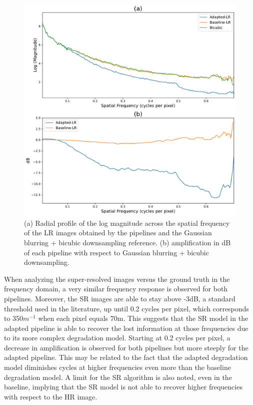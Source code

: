         \begin{figure}[H]
            \centering
            \includegraphics[scale=0.45]{Includes/5-lr-images-fft-comparison.pdf}
            \caption{(a) Radial profile of the log magnitude across the spatial frequency of the LR images obtained by the pipelines and the Gaussian blurring + bicubic downsampling reference. (b) amplification in dB of each pipeline with respect to Gaussian blurring + bicubic downsampling.}
            \label{fig:5-lr-images-fft-comparison.pdf}
        \end{figure}

        When analyzing the super-resolved images versus the ground truth in the frequency domain, a very similar frequency response is observed for both pipelines.
        Moreover, the SR images are able to stay above -3dB, a standard threshold used in the literature, up until 0.2 cycles per pixel, which corresponds to 350$m^{-1}$ when each pixel equals 70m.
        This suggests that the SR model in the adapted pipeline is able to recover the lost information at those frequencies due to its more complex degradation model.
        Starting at 0.2 cycles per pixel, a decrease in amplification is observed for both pipelines but more steeply for the adapted pipeline.
        This may be related to the fact that the adapted degradation model diminishes cycles at higher frequencies even more than the baseline degradation model. 
        A limit for the SR algorithm is also noted, even in the baseline, implying that the SR model is not able to recover higher frequencies with respect to the HR image.

